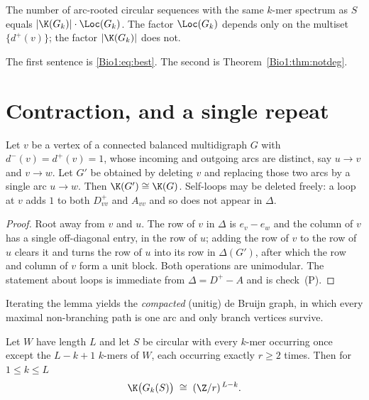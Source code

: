\begin{proposition}[Decomposition]\label{Bio1:prop:decomp}
The number of arc-rooted circular sequences with the same $k$-mer spectrum as $S$ equals
$|\K(G_k)|\cdot\Loc(G_k)$. The factor $\Loc(G_k)$ depends only on the multiset
$\{d^{+}(v)\}$; the factor $|\K(G_k)|$ does not.
\end{proposition}

The first sentence is \eqref{Bio1:eq:best}. The second is Theorem~\ref{Bio1:thm:notdeg}.

\section{Contraction, and a single repeat}\label{Bio1:sec:repeat}

\begin{lemma}\label{Bio1:lem:contract}
Let $v$ be a vertex of a connected balanced multidigraph $G$ with $d^{-}(v)=d^{+}(v)=1$,
whose incoming and outgoing arcs are distinct, say $u\to v$ and $v\to w$. Let $G'$ be
obtained by deleting $v$ and replacing those two arcs by a single arc $u\to w$. Then
$\K(G')\cong\K(G)$. Self-loops may be deleted freely: a loop at $v$ adds $1$ to both
$D^{+}_{vv}$ and $A_{vv}$ and so does not appear in $\Delta$.
\end{lemma}

\begin{proof}
Root away from $v$ and $u$. The row of $v$ in $\Delta$ is $e_v-e_w$ and the column of $v$
has a single off-diagonal entry, in the row of $u$; adding the row of $v$ to the row of $u$
clears it and turns the row of $u$ into its row in $\Delta(G')$, after which the row and
column of $v$ form a unit block. Both operations are unimodular. The statement about loops
is immediate from $\Delta=D^{+}-A$ and is check~(P).
\end{proof}

Iterating the lemma yields the \emph{compacted} (unitig) de Bruijn graph, in which every
maximal non-branching path is one arc and only branch vertices survive.

\begin{theorem}\label{Bio1:thm:repeat}
Let $W$ have length $L$ and let $S$ be circular with every $k$-mer occurring once except
the $L-k+1$ $k$-mers of $W$, each occurring exactly $r\ge2$ times. Then for $1\le k\le L$
\[
\K\bigl(G_k(S)\bigr)\;\cong\;(\Z/r)^{\,L-k}.
\]
\end{theorem}

